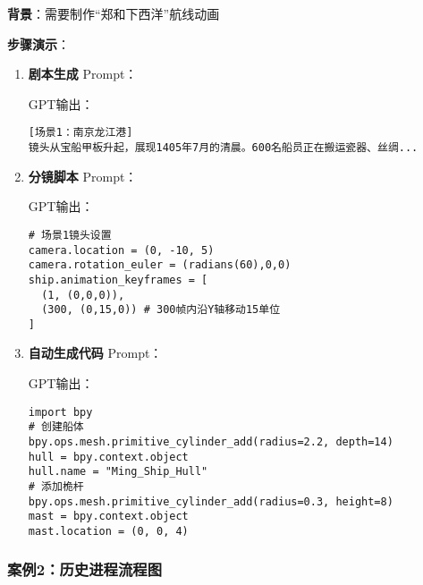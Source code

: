 \textbf{背景}：需要制作``郑和下西洋''航线动画

\textbf{步骤演示}：

\begin{enumerate}
\def\labelenumi{\arabic{enumi}.}
\item
  \textbf{剧本生成}
  Prompt：

  GPT输出：

\begin{gptbox}
\small{
\begin{lstlisting}
[场景1：南京龙江港] 
镜头从宝船甲板升起，展现1405年7月的清晨。600名船员正在搬运瓷器、丝绸...
\end{lstlisting}
}
\end{gptbox}
\item
  \textbf{分镜脚本}
  Prompt：

  GPT输出：
\begin{gptbox}
\small{
\begin{lstlisting}
# 场景1镜头设置
camera.location = (0, -10, 5)
camera.rotation_euler = (radians(60),0,0)
ship.animation_keyframes = [
  (1, (0,0,0)), 
  (300, (0,15,0)) # 300帧内沿Y轴移动15单位
]
\end{lstlisting}
}
\end{gptbox}
\item
  \textbf{自动生成代码} Prompt：

  GPT输出：

\begin{gptbox}
\small{
\begin{lstlisting}
import bpy
# 创建船体
bpy.ops.mesh.primitive_cylinder_add(radius=2.2, depth=14)
hull = bpy.context.object
hull.name = "Ming_Ship_Hull"
# 添加桅杆
bpy.ops.mesh.primitive_cylinder_add(radius=0.3, height=8)
mast = bpy.context.object
mast.location = (0, 0, 4)
\end{lstlisting}
}
\end{gptbox}
\end{enumerate}

\hypertarget{ux6848ux4f8b2ux5386ux53f2ux8fdbux7a0bux6d41ux7a0bux56fe}{%
\subsubsection{案例2：历史进程流程图}\label{ux6848ux4f8b2ux5386ux53f2ux8fdbux7a0bux6d41ux7a0bux56fe}}

